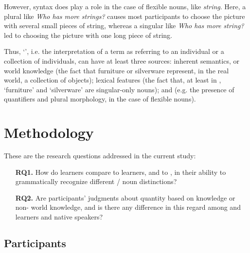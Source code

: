 \documentclass[output=paper]{langsci/langscibook}
\begin{document}
However, syntax does play a role in the case of flexible nouns, like \textit{string}. Here, a plural  like \textit{Who has more strings?} causes most participants to choose the picture with several small pieces of string, whereas a singular  like \textit{Who has more string?} led to choosing the picture with one long piece of string. 

Thus, ‘’, i.e. the interpretation of a term as referring to an individual or a collection of individuals, can have at least three sources: inherent semantics, or world knowledge (the fact that furniture or silverware represent, in the real world, a collection of objects); lexical features (the fact that, at least in , ‘furniture’ and ‘silverware’ are singular-only nouns); and  (e.g. the presence of quantifiers and plural morphology, in the case of flexible nouns). 


\section{Methodology}

These are the research questions addressed in the current study: 

\begin{itemize}
\item[\textbf{RQ1.}] How do  learners compare to  learners, and to , in their ability to grammatically recognize different / noun distinctions?

\item[\textbf{RQ2.}] Are participants’ judgments about quantity based on  knowledge or non- world knowledge, and is there any difference in this regard among  and  learners and native  speakers? 
\end{itemize}

\subsection{Participants}
\end{document}
